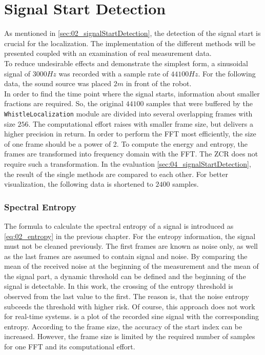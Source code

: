 \section{Signal Start Detection}
\label{sec:03_signalStartDetection}

As mentioned in \cref{sec:02_signalStartDetection}, the detection of the
signal start is crucial for the localization.
The implementation of the different methods will be presented coupled with
an examination of real measurement data.
\\
To reduce undesirable effects and demonstrate the simplest form, a sinusoidal
signal of $3000\si{Hz}$ was recorded with a sample rate of $44100\si{Hz}$.
For the following data, the sound source was placed $2\si{m}$ in front of the robot.
\\
In order to find the time point where the signal starts, information about
smaller fractions are required.
So, the original $44100$ samples that were buffered by the
\lstinline!WhistleLocalization! module are divided into several overlapping
frames with size $256$. The computational effort raises with smaller frame size,
but delivers a higher precision in return.
In order to perform the \ac{FFT} most efficiently, the size of one frame
should be a power of 2.
To compute the energy and entropy, the frames are transformed into
frequency domain with the \ac{FFT}.
The \ac{ZCR} does not require such a transformation.
In the evaluation \cref{sec:04_signalStartDetection}, the result of the single
methods are compared to each other.
For better visualization, the following data is shortened to $2400$ samples.


\subsubsection*{Spectral Entropy}

The formula to calculate the spectral entropy of a signal is introduced as \cref{eq:02_entropy}
in the previous chapter.
For the entropy information, the signal must not be cleaned previously.
The first frames are known as noise only, as well as the last frames are assumed
to contain signal and noise.
By comparing the mean of the received noise at the beginning of the measurement and
the mean of the signal part, a dynamic threshold can be defined and the beginning of the
signal is detectable.
In this work, the crossing of the entropy threshold is observed from the last
value to the first. The reason is, that the noise entropy subceeds the threshold with higher risk.
Of course, this approach does not work for real-time systems.
 is a plot of the recorded sine signal with the corresponding
entropy.
According to the frame size, the accuracy of the start index can be increased.
However, the frame size is limited by the required number of samples for one \ac{FFT} and
its computational effort.

